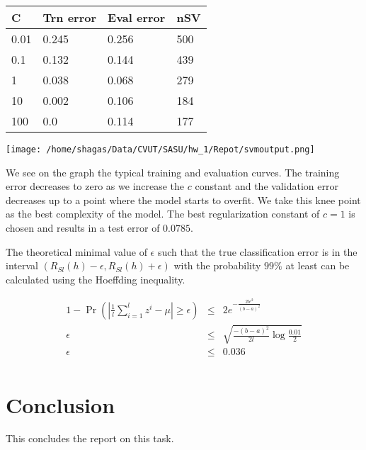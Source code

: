 \documentclass[11pt]{article}
\begin{document}
\begin{center}
\begin{tabular}{ | m{2em} | m{2cm} | m{2cm} | m{2cm} |} 
\hline
C  & Trn error & Eval error & nSV \\ 
\hline
0.01  & 0.245 & 0.256 & 500 \\
\hline
0.1  & 0.132 & 0.144 & 439 \\
\hline
1  & 0.038 & 0.068 & 279 \\
\hline
10  & 0.002 & 0.106 & 184 \\
\hline
100  & 0.0 & 0.114 & 177 \\


\hline
\end{tabular}
\end{center}

\begin{center}
\texttt{[image: /home/shagas/Data/CVUT/SASU/hw\_1/Repot/svmoutput.png]}
\end{center}

We see on the graph the typical training and evaluation curves. The training error decreases to zero as we increase the $c$ constant and the validation error decreases up to a point where the model starts to overfit. We take this knee point as the best complexity of the model.
The best regularization constant of $c = 1$ is chosen and results in a test error of $0.0785$.

The theoretical minimal value of $\epsilon$ such that the true classification error is in the
interval $(R_{Sl}(h) - \epsilon, R_{Sl} (h) +  \epsilon)$ with the probability $99\%$ at least can be calculated using the Hoeffding inequality. 


\begin{eqnarray}
 1 - \Pr{(\left| \frac{1}{l} \sum\limits_{i=1}^l z^i - \mu  \right| \geq \epsilon) } &\leq& 2e^{-\frac{2l \epsilon^2}{(b-a)^2}}      \nonumber \\
 \epsilon &\leq& \sqrt{\frac{-(b-a)^2}{2l}\log{\frac{0.01}{2}}}     \nonumber \\
  \epsilon &\leq& 0.036    \nonumber \\
\end{eqnarray}

\section{Conclusion}
This concludes the report on this task.
\end{document}
